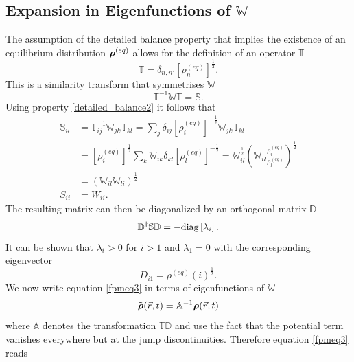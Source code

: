 \subsection{Expansion in Eigenfunctions of $\mathbb{W}$}
The assumption of the detailed balance property that implies the existence of an equilibrium distribution $\boldsymbol{\mathbf{\rho}}^{(eq)}$ allows for the definition of an operator $\mathbb{T}$
\begin{equation}
    \mathbb{T} = \delta_{n,n'} [\rho_n^{(eq)}]^{\frac{1}{2}}.
    \label{symmetrisation_transform}
\end{equation}
This is a similarity transform that symmetrises $\mathbb{W}$
\begin{equation}
    \mathbb{T}^{-1}\mathbb{W}\mathbb{T} = \mathbb{S}.
    \label{symm_rate_matrix}
\end{equation}
Using property \eqref{detailed_balance2} it follows that
\begin{align}
    \mathbb{S}_{il} &= \mathbb{T}^{-1}_{ij} \mathbb{W}_{jk} \mathbb{T}_{kl} = \sum_j \delta_{ij} [\rho^{(eq)}_i]^{-\frac{1}{2}} \mathbb{W}_{jk} \mathbb{T}_{kl} \\ \nonumber
    &= [\rho^{(eq)}_{i}]^{\frac{1}{2}} \sum_{k} \mathbb{W}_{ik} \delta_{kl} [\rho^{(eq)}_l]^{-\frac{1}{2}} = \mathbb{W}_{il}^{\frac{1}{2}} \left( \mathbb{W}_{il} \frac{\rho^{(eq)}_i}{\rho^{(eq)}_l} \right)^{\frac{1}{2}} \\ \nonumber
    &= \left(\mathbb{W}_{il} \mathbb{W}_{li}\right)^{\frac{1}{2}} \\ \nonumber
    S_{ii} &= W_{ii}.
\end{align}
The resulting matrix can then be diagonalized by an orthogonal matrix $\mathbb{D}$
\begin{equation}
    \mathbb{D}^{\dagger} \mathbb{S} \mathbb{D} = -{\rm diag}\left[ \lambda_i \right].
    \label{orthogonal_transform}
\end{equation}
It can be shown that $\lambda_i > 0$ for $i>1$ and $\lambda_1 = 0$ with the corresponding eigenvector
\begin{equation}
    D_{i1} = \rho^{(eq)}(i)^{\frac{1}{2}}.
\end{equation}
We now write equation \eqref{fpmeq3} in terms of eigenfunctions of $\mathbb{W}$
\begin{equation}
    \tilde{\boldsymbol{\mathbf{\rho}}}(\vec{r},t) = \mathbb{A}^{-1} \boldsymbol{\mathbf{\rho}}(\vec{r},t)
    \label{eigenfunctions}
\end{equation}
where $\mathbb{A}$ denotes the transformation $\mathbb{T}\mathbb{D}$ and use the fact that the potential term vanishes everywhere but at the jump discontinuities. Therefore equation \eqref{fpmeq3} reads
